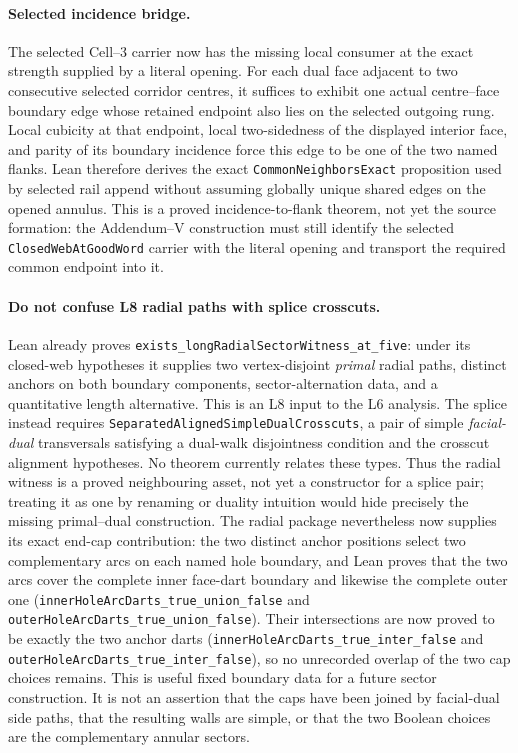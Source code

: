 \documentclass[11pt]{article}
\theoremstyle{definition}
\begin{document}
\paragraph{Selected incidence bridge.}
The selected Cell--3 carrier now has the missing local consumer at the exact
strength supplied by a literal opening.  For each dual face adjacent to two
consecutive selected corridor centres, it suffices to exhibit one actual
centre--face boundary edge whose retained endpoint also lies on the selected
outgoing rung.  Local cubicity at that endpoint, local two-sidedness of the
displayed interior face, and parity of its boundary incidence force this edge
to be one of the two named flanks.  Lean therefore derives the exact
\texttt{CommonNeighborsExact} proposition used by selected rail append without
assuming globally unique shared edges on the opened annulus.  This is a proved
incidence-to-flank theorem, not yet the source formation: the Addendum--V
construction must still identify the selected \texttt{ClosedWebAtGoodWord}
carrier with the literal opening and transport the required common endpoint
into it.

\paragraph{Do not confuse L8 radial paths with splice crosscuts.}  Lean already
proves \texttt{exists\_longRadialSectorWitness\_at\_five}: under its
closed-web hypotheses it supplies two vertex-disjoint \emph{primal} radial
paths, distinct anchors on both boundary components, sector-alternation data,
and a quantitative length alternative.  This is an L8 input to the L6
analysis.  The
splice instead requires \texttt{SeparatedAlignedSimpleDualCrosscuts}, a pair
of simple \emph{facial-dual} transversals satisfying a dual-walk disjointness
condition and the crosscut alignment hypotheses.  No theorem currently
relates these types.  Thus the radial witness is a proved neighbouring asset,
not yet a constructor for a splice pair; treating it as one by renaming or
duality intuition would hide precisely the missing primal--dual construction.
The radial package nevertheless now supplies its exact end-cap contribution:
the two distinct anchor positions select two complementary arcs on each named
hole boundary, and Lean proves that the two arcs cover the complete inner
face-dart boundary and likewise the complete outer one
(\texttt{innerHoleArcDarts\_true\_union\_false} and
\texttt{outerHoleArcDarts\_true\_union\_false}).  Their intersections are
now proved to be exactly the two anchor darts
(\texttt{innerHoleArcDarts\_true\_inter\_false} and
\texttt{outerHoleArcDarts\_true\_inter\_false}), so no unrecorded overlap
of the two cap choices remains.  This is useful fixed boundary data for a
future sector construction.  It is not an assertion that the caps have been
joined by facial-dual side paths, that the resulting walls are simple, or that
the two Boolean choices are the complementary annular sectors.
\end{document}
